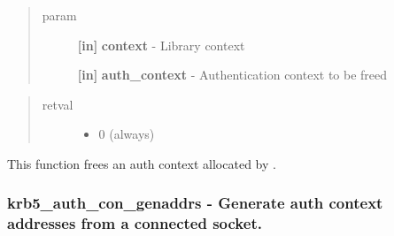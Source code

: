 \documentclass[letterpaper,10pt,english]{sphinxmanual}
\begin{document}
\begin{quote}\begin{description}
\item[{param}] \leavevmode
\textbf{{[}in{]}} \textbf{context} - Library context

\textbf{{[}in{]}} \textbf{auth\_context} - Authentication context to be freed

\end{description}\end{quote}
\begin{quote}\begin{description}
\item[{retval}] \leavevmode\begin{itemize}
\item {} 
0   (always)

\end{itemize}

\end{description}\end{quote}

This function frees an auth context allocated by {\hyperref[appdev/refs/api/krb5_auth_con_init:c.krb5_auth_con_init]{}} .


\subsubsection{krb5\_auth\_con\_genaddrs -  Generate auth context addresses from a connected socket.}
\label{appdev/refs/api/krb5_auth_con_genaddrs::doc}\label{appdev/refs/api/krb5_auth_con_genaddrs:krb5-auth-con-genaddrs-generate-auth-context-addresses-from-a-connected-socket}

\begin{fulllineitems}
\label{appdev/refs/api/krb5_auth_con_genaddrs:c.krb5_auth_con_genaddrs}
\end{fulllineitems}
\end{document}
